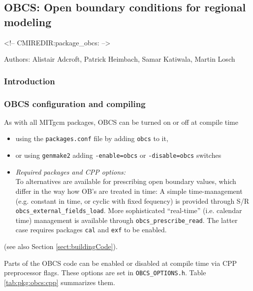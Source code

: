 \subsection{OBCS: Open boundary conditions for regional modeling}

\label{sec:pkg:obcs}
\begin{rawhtml}
<!-- CMIREDIR:package_obcs: -->
\end{rawhtml}

Authors: 
Alistair Adcroft, Patrick Heimbach, Samar Katiwala, Martin Losch

\subsubsection{Introduction
\label{sec:pkg:obcs:intro}}




\subsubsection{OBCS configuration and compiling
\label{sec:pkg:obcs:comp}}

As with all MITgcm packages, OBCS can be turned on or off 
at compile time
%
\begin{itemize}
%
\item
using the \texttt{packages.conf} file by adding \texttt{obcs} to it,
%
\item
or using \texttt{genmake2} adding
\texttt{-enable=obcs} or \texttt{-disable=obcs} switches
%
\item
\textit{Required packages and CPP options:} \\
%
To alternatives are available for prescribing open boundary values,
which differ in the way how OB's are treated in time:
A simple time-management (e.g. constant in time, or cyclic with
fixed fequency) is provided through 
S/R \texttt{obcs\_external\_fields\_load}.
More sophisticated ``real-time'' (i.e. calendar time) management is
available through \texttt{obcs\_prescribe\_read}. 
The latter case requires
packages \texttt{cal} and \texttt{exf} to be enabled.
%
\end{itemize}
(see also Section \ref{sect:buildingCode}).

Parts of the OBCS code can be enabled or disabled at compile time
via CPP preprocessor flags. These options are set in
\texttt{OBCS\_OPTIONS.h}. Table \ref{tab:pkg:obcs:cpp} summarizes them.

